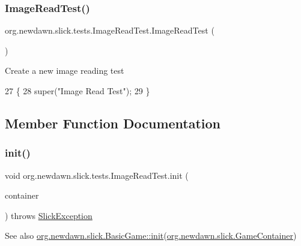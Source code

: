 \subsubsection{\texorpdfstring{Image\+Read\+Test()}{ImageReadTest()}}
{\footnotesize\ttfamily org.\+newdawn.\+slick.\+tests.\+Image\+Read\+Test.\+Image\+Read\+Test (\begin{DoxyParamCaption}{ }\end{DoxyParamCaption})\hspace{0.3cm}{\ttfamily [inline]}}

Create a new image reading test 
\begin{DoxyCode}
27                            \{
28         super(\textcolor{stringliteral}{"Image Read Test"});
29     \}
\end{DoxyCode}


\subsection{Member Function Documentation}
\mbox{\label{classorg_1_1newdawn_1_1slick_1_1tests_1_1_image_read_test_a2c97baa516a59d3dad308bf3e2311280}} 
\subsubsection{\texorpdfstring{init()}{init()}}
{\footnotesize\ttfamily void org.\+newdawn.\+slick.\+tests.\+Image\+Read\+Test.\+init (\begin{DoxyParamCaption}\item[{\mbox{\hyperlink{classorg_1_1newdawn_1_1slick_1_1_game_container}{Game\+Container}}}]{container }\end{DoxyParamCaption}) throws \mbox{\hyperlink{classorg_1_1newdawn_1_1slick_1_1_slick_exception}{Slick\+Exception}}\hspace{0.3cm}{\ttfamily [inline]}}

\begin{DoxySeeAlso}{See also}
\mbox{\hyperlink{classorg_1_1newdawn_1_1slick_1_1_basic_game_a8af0900217e4d389249f71367b22d114}{org.\+newdawn.\+slick.\+Basic\+Game\+::init}}(\mbox{\hyperlink{classorg_1_1newdawn_1_1slick_1_1_game_container}{org.\+newdawn.\+slick.\+Game\+Container}}) 
\end{DoxySeeAlso}


